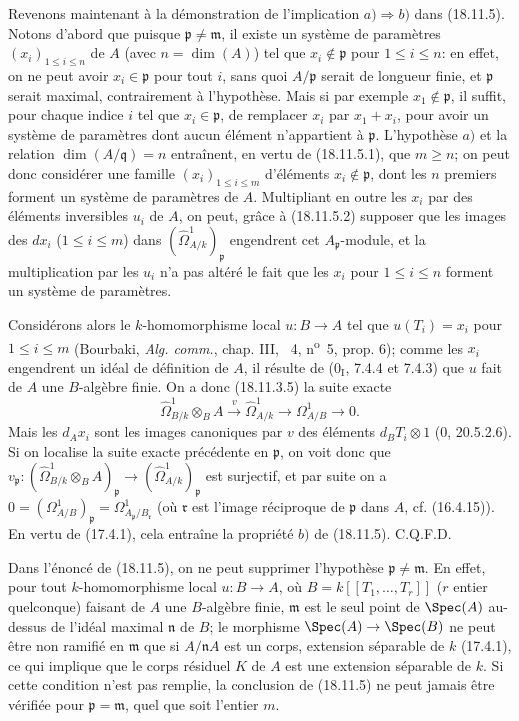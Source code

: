 Revenons maintenant à la démonstration de l'implication $a)\Rightarrow b)$ dans (18.11.5). Notons d'abord que puisque $\mathfrak p\neq\mathfrak m$, il existe un système de paramètres $(x_i)_{1\leq i\leq n}$ de $A$ (avec $n=\dim(A)$) tel que $x_i\notin\mathfrak p$ pour $1\leq i\leq n$: en effet, on ne peut avoir $x_i\in\mathfrak p$ pour tout $i$, sans quoi $A/\mathfrak p$ serait de longueur finie, et $\mathfrak p$ serait maximal, contrairement à l'hypothèse. Mais si par exemple $x_1\notin\mathfrak p$, il suffit, pour chaque indice $i$ tel que $x_i\in\mathfrak p$, de remplacer $x_i$ par $x_1+x_i$, pour avoir un système de paramètres dont aucun élément n'appartient à $\mathfrak p$. L'hypothèse $a)$ et la relation $\dim(A/\mathfrak q)=n$ entraînent, en vertu de (18.11.5.1), que $m\geq n$; on peut donc considérer une famille $(x_i)_{1\leq i\leq m}$ d'éléments $x_i\notin\mathfrak p$, dont les $n$ premiers forment un système de paramètres de $A$. Multipliant en outre les $x_i$ par des éléments inversibles $u_i$ de $A$, on peut, grâce à (18.11.5.2) supposer que les images des $dx_i$ ($1\leq i\leq m$) dans $(\hat{\Omega}^1_{A/k})_{\mathfrak p}$ engendrent cet $A_{\mathfrak p}$-module, et la multiplication par les $u_i$ n'a pas altéré le fait que les $x_i$ pour $1\leq i\leq n$ forment un système de paramètres.

Considérons alors le $k$-homomorphisme local $u:B\to A$ tel que $u(T_i)=x_i$ pour $1\leq i\leq m$ (Bourbaki, \emph{Alg. comm.}, chap. III, \textsection~4, n\textsuperscript{o}~5, prop. 6); comme les $x_i$ engendrent un idéal de définition de $A$, il résulte de ($0_{\mathrm I}$, 7.4.4 et 7.4.3) que $u$ fait de $A$ une $B$-algèbre finie. On a donc (18.11.3.5) la suite exacte
\[
  \hat{\Omega}^1_{B/k}\otimes_B A\xrightarrow{v}\hat{\Omega}^1_{A/k}\longrightarrow\Omega^1_{A/B}\longrightarrow0.
\]
Mais les $d_Ax_i$ sont les images canoniques par $v$ des éléments $d_BT_i\otimes1$ (0, 20.5.2.6). Si on localise la suite exacte précédente en $\mathfrak p$, on voit donc que $v_{\mathfrak p}:(\hat{\Omega}^1_{B/k}\otimes_B A)_{\mathfrak p}\to(\hat{\Omega}^1_{A/k})_{\mathfrak p}$ est surjectif, et par suite on a $0=(\Omega^1_{A/B})_{\mathfrak p}=\Omega^1_{A_{\mathfrak p}/B_{\mathfrak r}}$ (où $\mathfrak r$ est l'image réciproque de $\mathfrak p$ dans $A$, cf. (16.4.15)). En vertu de (17.4.1), cela entraîne la propriété $b)$ de (18.11.5). C.Q.F.D.

\begin{remark}[18.11.6]
\label{IV.18.11.6}
Dans l'énoncé de (18.11.5), on ne peut supprimer l'hypothèse $\mathfrak p\neq\mathfrak m$. En effet, pour tout $k$-homomorphisme local $u:B\to A$, où $B=k[[T_1,\ldots,T_r]]$ ($r$ entier quelconque) faisant de $A$ une $B$-algèbre finie, $\mathfrak m$ est le seul point de $\Spec(A)$ au-dessus de l'idéal maximal $\mathfrak n$ de $B$; le morphisme $\Spec(A)\to\Spec(B)$ ne peut être non ramifié en $\mathfrak m$ que si $A/\mathfrak nA$ est un corps, extension séparable de $k$ (17.4.1), ce qui implique que le corps résiduel $K$ de $A$ est une extension séparable de $k$. Si cette condition n'est pas remplie, la conclusion de (18.11.5) ne peut jamais être vérifiée pour $\mathfrak p=\mathfrak m$, quel que soit l'entier $m$.
\end{remark}

